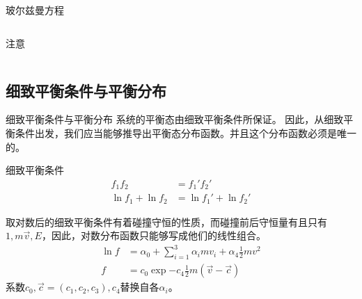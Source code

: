 \documentclass{if-beamer}
\begin{document}
\begin{frame}{玻尔兹曼方程}
\begin{columns}
\begin{column}{0.5\textwidth}
\begin{alertblock}{注意}
\end{alertblock}
    
\end{column}




\end{columns}
\end{frame}
\subsection{细致平衡条件与平衡分布}
\begin{frame}{细致平衡条件与平衡分布}
    系统的平衡态由细致平衡条件所保证。
    因此，从细致平衡条件出发，我们应当能够推导出平衡态分布函数。并且这个分布函数必须是唯一的。

        \begin{block}{细致平衡条件}
            \begin{equation*}
                \begin{aligned}
                    f_1f_2&=f_1'f_2'\\
                    \ln{f_1}+\ln{f_2}&=\ln{f_1'}+\ln{f_2'}
                \end{aligned}
            \end{equation*}
        \end{block}
        \begin{block}{}
            取对数后的细致平衡条件有着碰撞守恒的性质，而碰撞前后守恒量有且只有$1,m\vec{v},E$，因此，对数分布函数只能够写成他们的线性组合。
            \begin{equation*}
                \begin{aligned}
                    \ln{f}&=\alpha_0+\sum_{i=1}^{3}{\alpha_imv_i}+\alpha_4\frac12mv^2\\
                    f&=c_0\exp{-c_4\frac12m(\vec{v}-\vec{c})}
                \end{aligned}
            \end{equation*}
            系数$c_0,\vec{c}=(c_1,c_2,c_3),c_4$替换自各$\alpha_i$。
        \end{block}
    

\end{frame}
\end{document}
